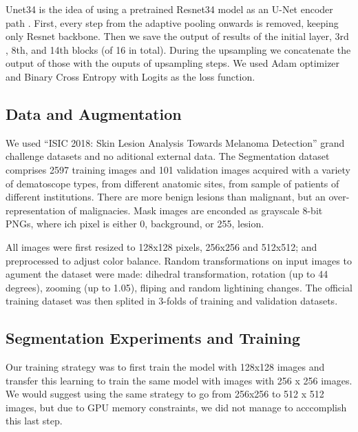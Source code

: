 \documentclass[conference]{IEEEtran}
\begin{document}
Unet34 is the idea of using a pretrained Resnet34 model as an U-Net encoder path \cite{fastai}. First, every step from the adaptive pooling onwards is removed, keeping only Resnet backbone. Then we save the output of results of the initial layer, 3rd , 8th, and 14th blocks (of 16 in total). During the upsampling we concatenate the output of those with the ouputs of upsampling steps. We used Adam optimizer and Binary Cross Entropy with Logits as the loss function.

\subsection{Data and Augmentation}
We used “ISIC 2018: Skin Lesion Analysis Towards Melanoma Detection” grand challenge datasets \cite{codella, ham} and no aditional external data. The Segmentation dataset comprises 2597 training images and 101 validation images acquired with a variety of dematoscope types, from different anatomic sites, from sample of patients of different institutions. There are more benign lesions than malignant, but an over-representation of malignacies. Mask images are enconded as grayscale 8-bit PNGs, where ich pixel is either 0, background, or 255, lesion. 

All images were first resized to 128x128 pixels, 256x256 and 512x512; and preprocessed to adjust color balance. Random transformations on input images to agument the dataset were made: dihedral transformation, rotation (up to 44 degrees), zooming (up to 1.05), fliping and random lightining changes. The official training dataset was then splited in 3-folds of training and validation datasets.  


\subsection{Segmentation Experiments and Training}
\label{sec:seg_training}
Our training strategy was to first train the model with 128x128 images and transfer this learning to train the same model with images with 256 x 256 images. We would suggest using the same strategy to go from 256x256 to 512 x 512 images, but due to GPU memory constraints, we did not manage to acccomplish this last step.
\end{document}
